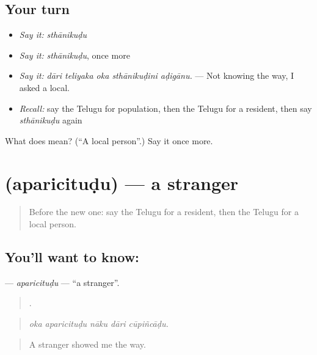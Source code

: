 \subsection*{Your turn}
\begin{itemize}
\raggedright
  \item \emph{Say it:} \emph{sthānikuḍu}
  \item \emph{Say it:} \emph{sthānikuḍu}, once more
  \item \emph{Say it:} \emph{dāri teliyaka oka sthānikuḍini aḍigānu.} — Not knowing the way, I asked a local.
  \item \emph{Recall:} say the Telugu for population, then the Telugu for a resident, then say \emph{sthānikuḍu} again
\end{itemize}

\begin{tcolorbox}[breakable,colback=teal!4,colframe=teal!35!black,title={Before you move on}]
What does  mean? (\textquotedblleft{}A local person\textquotedblright{}.) Say it once more.
\end{tcolorbox}
\section[\texorpdfstring{\te{అపరిచితుడు} (aparicituḍu)}{అపరిచితుడు (aparicituḍu)}]{ (aparicituḍu) — a stranger}

\label{lesson:TE-C465-aparicitudu}



\begin{quote}
Before the new one: say the Telugu for a resident, then the Telugu for a local person.
\end{quote}

\subsection*{You'll want to know: }
\textbf{} — \emph{aparicituḍu} — \textquotedblleft{}a stranger\textquotedblright{}.

\begin{quote}
    .
\end{quote}

\begin{quote}
\emph{oka aparicituḍu nāku dāri cūpiñcāḍu.}
\end{quote}

\begin{quote}
A stranger showed me the way.
\end{quote}

